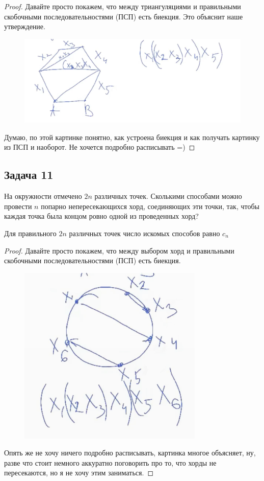 \begin{proof}
    Давайте просто покажем, что между триангуляциями и правильными скобочными последовательностями (ПСП) есть биекция. Это объяснит наше утверждение. 

    \begin{figure}[H]
        \centering
        \includegraphics[width=1\linewidth]{Figures/sem05_task10.png}
    \end{figure}

    Думаю, по этой картинке понятно, как устроена биекция и как получать картинку из ПСП и наоборот. Не хочется подробно расписывать =)
\end{proof}

\subsection{Задача 11}
На окружности отмечено $2n$ различных точек. Сколькими способами можно провести
$n$ попарно непересекающихся хорд, соединяющих эти точки, так, чтобы каждая точка
была концом ровно одной из проведенных хорд?

\begin{claim*} 
Для правильного $2n$ различных точек число искомых способов равно $c_n$
\end{claim*}

\begin{proof}
Давайте просто покажем, что между выбором хорд и правильными скобочными последовательностями (ПСП) есть биекция.

\begin{figure}[H]
    \centering
    \includegraphics[width=0.5\linewidth]{Figures/sem05_task11.png}
\end{figure}
Опять же не хочу ничего подробно расписывать, картинка многое объясняет, ну, разве что стоит немного аккуратно поговорить про то, что хорды не пересекаются, но я не хочу этим заниматься. 
\end{proof}